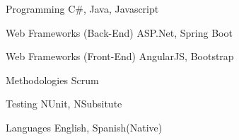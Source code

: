 


\begin{cvskills}


\cvskill
{Programming} %
{C\#, Java, Javascript} %


\cvskill
{Web Frameworks (Back-End)} %
{ASP.Net, Spring Boot} %

\cvskill
{Web Frameworks (Front-End)} %
{AngularJS, Bootstrap} %


\cvskill
{Methodologies}
{Scrum}

\cvskill
{Testing}
{NUnit, NSubsitute}

\cvskill
{Languages} %
{English, Spanish(Native)} %

\end{cvskills}